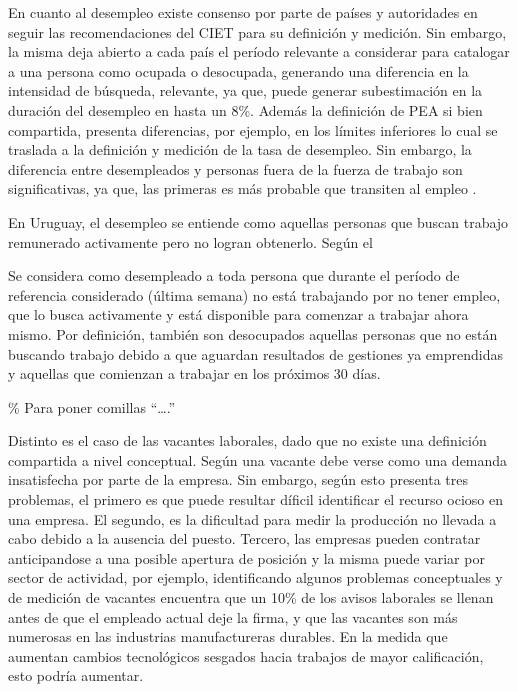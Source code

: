 \documentclass[msc,oneside,a4paper]{udelar} %
\begin{document}
  En cuanto al desempleo existe consenso por parte de países y autoridades en seguir las recomendaciones del CIET para su definición y medición. Sin embargo, la misma deja abierto a cada país el período relevante a considerar para catalogar a una persona como ocupada o desocupada, generando una diferencia en la intensidad de búsqueda\cite{Elsby2015}, relevante, ya que, puede generar subestimación en la duración del desempleo en hasta un 8\%\cite{Poterba}. Además la definición de PEA si bien compartida, presenta diferencias, por ejemplo, en los límites inferiores lo cual se traslada a la definición y medición de la tasa de desempleo. Sin embargo, la diferencia entre desempleados y personas fuera de la fuerza de trabajo son significativas, ya que, las primeras es más probable que transiten al empleo \cite{Flinn y Heckaman}.
  
  En Uruguay, el desempleo se entiende como aquellas personas que buscan trabajo remunerado activamente pero no logran obtenerlo. Según el \cite{INE2019}
  \begin{center}
      \begin{minipage}{0.95\linewidth}
          \vspace{1pt}
          {\small
  Se considera como desempleado a toda persona que durante el período de referencia considerado (última semana) no está trabajando por no tener empleo, que lo busca activamente y está disponible para comenzar a trabajar ahora mismo. Por definición, también son desocupados aquellas personas que no están buscando trabajo debido a que aguardan resultados de gestiones ya emprendidas y aquellas que comienzan a trabajar en los próximos 30 días.}
          \vspace{1pt}
      \end{minipage}
  \end{center}
  \% Para poner comillas ``\ldots{}.''
  
  Distinto es el caso de las vacantes laborales, dado que no existe una definición compartida a nivel conceptual. Según \cite{Abraham1983} una vacante debe verse como una demanda insatisfecha por parte de la empresa. Sin embargo, según \cite{Elsby2015} esto presenta tres problemas, el primero es que puede resultar díficil identificar el recurso ocioso en una empresa. El segundo, es la dificultad para medir la producción no llevada a cabo debido a la ausencia del puesto. Tercero, las empresas pueden contratar anticipandose a una posible apertura de posición y la misma puede variar por sector de actividad, por ejemplo, \cite{Myers1966} identificando algunos problemas conceptuales y de medición de vacantes encuentra que un 10\% de los avisos laborales se llenan antes de que el empleado actual deje la firma, y que las vacantes son más numerosas en las industrias manufactureras durables. En la medida que aumentan cambios tecnológicos sesgados hacia trabajos de mayor calificación, esto podría aumentar.
  
\end{document}

